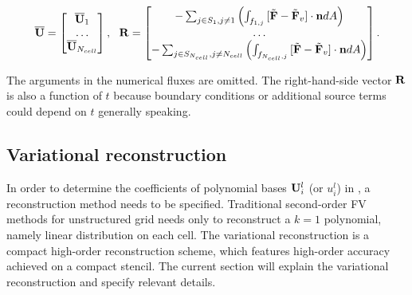 \begin{equation}
    \overline{\mathbf{U}} = \begin{bmatrix}
        \overline{\mathbf{U}}_1 \\
        \dots \\
        \overline{\mathbf{U}}_{N_{cell}}
    \end{bmatrix},\ \
    \mathbf{R} = \begin{bmatrix}
        -\sum_{j\in S_1, j\neq 1}{\left(
            \int_{f_{1,j}}{
                [\tilde{\mathbf{F}} - \tilde{\mathbf{F}}_v] \cdot \mathbf{n}  dA
            }\right)
        }     \\
        \dots \\
        -\sum_{j\in S_{N_{cell}}, j\neq N_{cell}}{\left(
            \int_{f_{N_{cell},j}}{
                [\tilde{\mathbf{F}} - \tilde{\mathbf{F}}_v] \cdot \mathbf{n}  dA
            }\right)
        }
    \end{bmatrix}.
\end{equation}

The arguments in the numerical fluxes are omitted.
The right-hand-side vector $\mathbf{R}$ is also a function of $t$
because boundary conditions or additional source terms
could depend on $t$ generally speaking.




\subsection{Variational reconstruction}
\label{ssec:VR}
In order to determine the coefficients of polynomial bases $\mathbf{U}_i^l$
(or $u_i^l$) in
, a reconstruction method needs to be specified.
Traditional second-order FV methods for unstructured grid
needs only to reconstruct a $k=1$ polynomial, namely linear
distribution on each cell.
The variational reconstruction \cite{wang2017compact_VR}
is a compact high-order
reconstruction scheme, which features high-order
accuracy achieved on a compact stencil.
The current section will explain the variational reconstruction
and specify relevant details.

